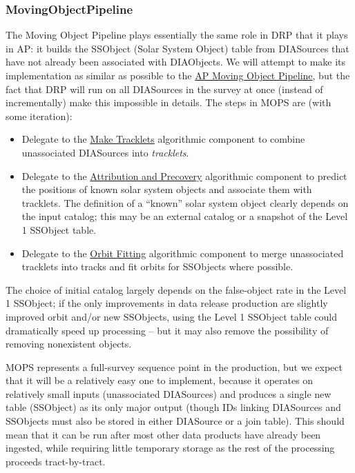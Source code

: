 \subsubsection{MovingObjectPipeline}
\label{sec:drpMovingObjectPipeline}

The Moving Object Pipeline plays essentially the same role in DRP that it plays in AP: it builds the SSObject (Solar System Object) table from DIASources that have not already been associated with DIAObjects.  We will attempt to make its implementation as similar as possible to the \hyperref[sec:apMovingObjectPipeline]{AP Moving Object Pipeline}, but the fact that DRP will run on all DIASources in the survey at once (instead of incrementally) make this impossible in details.  The steps in MOPS are (with some iteration):

\begin{itemize}
\item Delegate to the \hyperref[sec:acMakeTracklets]{Make Tracklets} algorithmic component to combine unassociated DIASources into \emph{tracklets}.
\item Delegate to the \hyperref[sec:acAttributionAndPrecovery]{Attribution and Precovery} algorithmic component to predict the positions of known solar system objects and associate them with tracklets.  The definition of a ``known'' solar system object clearly depends on the input catalog; this may be an external catalog or a snapshot of the Level 1 SSObject table.
\item Delegate to the \hyperref[sec:acOrbitFitting]{Orbit Fitting} algorithmic component to merge unassociated tracklets into tracks and fit orbits for SSObjects where possible.
\end{itemize}

The choice of initial catalog largely depends on the false-object rate in the Level 1 SSObject; if the only improvements in data release production are slightly improved orbit and/or new SSObjects, using the Level 1 SSObject table could dramatically speed up processing -- but it may also remove the possibility of removing nonexistent objects.

MOPS represents a full-survey sequence point in the production, but we expect that it will be a relatively easy one to implement, because it operates on relatively small inputs (unassociated DIASources) and produces a single new table (SSObject) as its only major output (though IDs linking DIASources and SSObjects must also be stored in either DIASource or a join table).  This should mean that it can be run after most other data products have already been ingested, while requiring little temporary storage as the rest of the processing proceeds tract-by-tract.

